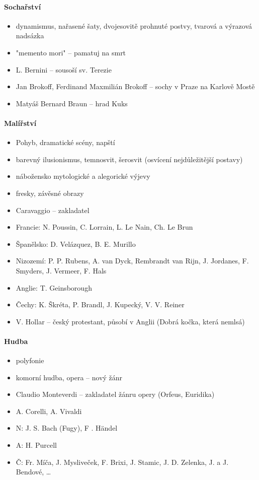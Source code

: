 \paragraph{Sochařství}
\begin{itemize}
\item dynamismus, nařasené šaty, dvojesovitě prohnuté postvy, tvarová a výrazová nadsázka
\item "memento mori" -- pamatuj na smrt
\item L. Bernini -- sousoší sv. Terezie
\item Jan Brokoff, Ferdinand Maxmilián Brokoff -- sochy v Praze na Karlově Mostě
\item Matyáš Bernard Braun -- hrad Kuks
\end{itemize}

\paragraph{Malířství}
\begin{itemize}
\item Pohyb, dramatické scény, napští
\item barevný ilusionismus, temnosvit, šerosvit (osvícení nejdůležitější postavy)
\item nábožensko mytologické a alegorické výjevy
\item fresky, závěsné obrazy
\item Caravaggio -- zakladatel
\item Francie: N. Poussin, C. Lorrain, L. Le Nain, Ch. Le Brun
\item Španělsko: D. Velázquez, B. E. Murillo
\item Nizozemí: P. P. Rubens, A. van Dyck, Rembrandt van Rijn, J. Jordanes, F. Smyders, J. Vermeer, F. Hals
\item Anglie: T. Geinsborough
\item Čechy: K. Škréta, P. Brandl, J. Kupecký, V. V. Reiner
\item V. Hollar -- český protestant, působí v Anglii (Dobrá kočka, která nemlsá)
\end{itemize}

\paragraph{Hudba}
\begin{itemize}
\item polyfonie
\item komorní hudba, opera -- nový žánr
\item Claudio Monteverdi -- zakladatel žánru opery (Orfeus, Euridika)
\item A. Corelli, A. Vivaldi
\item N: J. S. Bach (Fugy), F . Händel 
\item A: H. Purcell
\item Č: Fr. Míča, J. Mysliveček, F. Brixi, J. Stamic, J. D. Zelenka, J. a J. Bendové, \ldots
\end{itemize}

